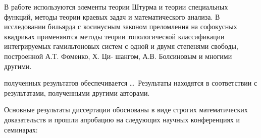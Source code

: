 %
%
{\methods} В работе используются элементы теории Штурма и теории специальных функций, методы теории краевых задач и математического анализа. В исследовании бильярда с косинусным законом преломления на софокусных квадриках применяются методы теории топологической классификации интегрируемых
гамильтоновых систем с одной и двумя степенями свободы, построенной А.Т. Фоменко, Х. Ци-
шангом, А.В. Болсиновым и многими другими.

{} полученных результатов обеспечивается \ldots \ Результаты находятся в соответствии с результатами, полученными другими авторами.


{\probation}
Основные результаты диссертации обоснованы в виде строгих математических доказательств и прошли апробацию на следующих научных конференциях и семинарах:

